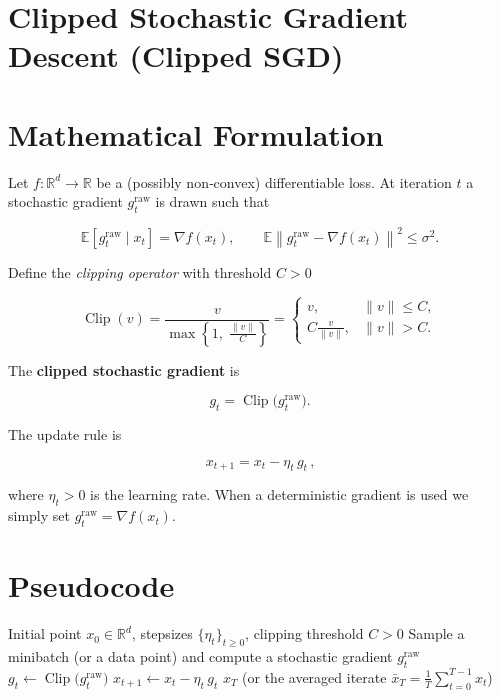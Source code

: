 \documentclass{article}
\newcommand{\E}{\mathbb{E}}
\newcommand{\R}{\mathbb{R}}
\begin{document}
\section*{Clipped Stochastic Gradient Descent (Clipped SGD)}

\section*{Mathematical Formulation}
Let $f:\R^{d}\rightarrow\R$ be a (possibly non‑convex) differentiable loss.  
At iteration $t$ a stochastic gradient $g^{\text{raw}}_{t}$ is drawn such that  

\[
\E\!\left[g^{\text{raw}}_{t}\mid x_{t}\right]=\nabla f(x_{t}),\qquad 
\E\!\left\|g^{\text{raw}}_{t}-\nabla f(x_{t})\right\|^{2}\le\sigma^{2}.
\]

Define the \emph{clipping operator} with threshold $C>0$  

\[
\operatorname{Clip}(v)=\frac{v}{\max\!\left\{1,\;\frac{\|v\|}{C}\right\}}
=
\begin{cases}
v, & \|v\|\le C,\\[4pt]
\displaystyle C\frac{v}{\|v\|}, & \|v\|>C .
\end{cases}
\]

The \textbf{clipped stochastic gradient} is  

\[
g_{t}= \operatorname{Clip}\!\bigl(g^{\text{raw}}_{t}\bigr).
\]

The update rule is  

\[
\boxed{\,x_{t+1}=x_{t}-\eta_{t}\,g_{t}\,},
\]

where $\eta_{t}>0$ is the learning rate.  
When a deterministic gradient is used we simply set $g^{\text{raw}}_{t}= \nabla f(x_{t})$.

\section*{Pseudocode}
\begin{algorithm}[H]
\caption{Clipped SGD}
\begin{algorithmic}[1]
\Require Initial point $x_{0}\in\R^{d}$, stepsizes $\{\eta_{t}\}_{t\ge0}$, clipping threshold $C>0$
    \State Sample a minibatch (or a data point) and compute a stochastic gradient $g^{\text{raw}}_{t}$
    \State $g_{t}\gets \operatorname{Clip}\!\bigl(g^{\text{raw}}_{t}\bigr)$ 
    \State $x_{t+1}\gets x_{t}-\eta_{t}\,g_{t}$ 
\EndFor
\State \Return $x_{T}$ (or the averaged iterate $\bar x_T=\frac1T\sum_{t=0}^{T-1}x_{t}$)
\end{algorithmic}
\end{algorithm}
\end{document}
